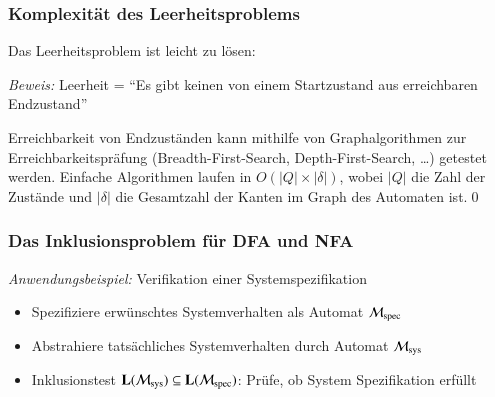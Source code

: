 \documentclass[aspectratio=1610,onlymath]{beamer}
\begin{document}
\begin{frame}\frametitle{Komplexität des Leerheitsproblems}

Das Leerheitsproblem ist leicht zu lösen:


\pause
\emph{Beweis:} Leerheit = "`Es gibt keinen von einem Startzustand aus erreichbaren Endzustand"'
\bigskip

Erreichbarkeit von Endzuständen kann mithilfe von Graphalgorithmen zur Erreichbarkeitspräfung (Breadth-First-Search, Depth-First-Search, \ldots) getestet werden. Einfache Algorithmen laufen in $O(|Q|\times |\delta|)$, wobei $|Q|$ die Zahl der Zustände und $|\delta|$ die Gesamtzahl der Kanten im Graph des Automaten ist.\qed

\end{frame}

\begin{frame}\frametitle{Das Inklusionsproblem für DFA und NFA}


\emph{Anwendungsbeispiel:}
Verifikation einer Systemspezifikation
\begin{itemize}
\item Spezifiziere erwünschtes Systemverhalten als Automat $\mathcal{M}_{\text{spec}}$
\item Abstrahiere tatsächliches Systemverhalten durch Automat $\mathcal{M}_{\text{sys}}$
\item Inklusionstest $\textbf{\textcolor{black}{L}}(\mathcal{M}_{\text{sys}})\subseteq\textbf{\textcolor{black}{L}}(\mathcal{M}_{\text{spec}})$: Prüfe, ob System Spezifikation erfüllt
\end{itemize}

\end{frame}
\end{document}
